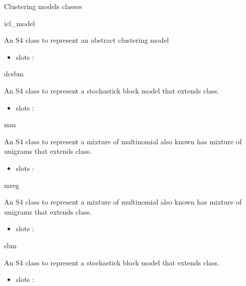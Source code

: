 \documentclass[letterpaper]{book}
\begin{document}
%
\begin{Description}\relax
Clustering models classes

icl\_model

An S4 class to represent an abstract clustering model
\begin{itemize}

\item slots : 

\end{itemize}


dcsbm

An S4 class to represent a stochastick block model that extends  class.
\begin{itemize}

\item slots : 

\end{itemize}


mm

An S4 class to represent a mixture of multinomial also known has mixture of unigrams that extends  class.
\begin{itemize}

\item slots : 

\end{itemize}


mreg

An S4 class to represent a mixture of multinomial also known has mixture of unigrams that extends  class.
\begin{itemize}

\item slots : 

\end{itemize}


sbm

An S4 class to represent a stochastick block model that extends  class.
\begin{itemize}

\item slots : 

\end{itemize}

\end{Description}
\end{document}
